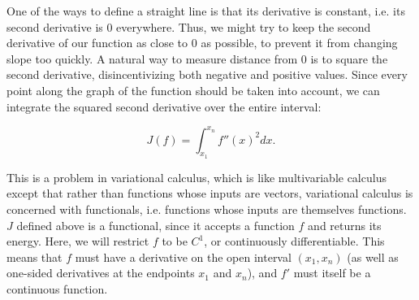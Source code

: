 \documentclass{article}
\begin{document}
One of the ways to define a straight line is that its derivative is constant,
i.e. its second derivative is 0 everywhere.
Thus, we might try to keep the second derivative of our function as close to 0 as possible,
to prevent it from changing slope too quickly.
A natural way to measure distance from 0 is to square the second derivative,
disincentivizing both negative and positive values.
Since every point along the graph of the function should be taken into account,
we can integrate the squared second derivative over the entire interval:

\[J(f) = \int_{x_1}^{x_n}f''(x)^2 dx.\]

This is a problem in variational calculus,
which is like multivariable calculus
except that rather than functions whose inputs are vectors,
variational calculus is concerned with functionals,
i.e. functions whose inputs are themselves functions.
$J$ defined above is a functional,
since it accepts a function $f$ and returns its energy.
Here, we will restrict $f$ to be $C^1$, or continuously differentiable.
This means that $f$ must have a derivative on the open interval $(x_1, x_n)$
(as well as one-sided derivatives at the endpoints $x_1$ and $x_n$),
and $f'$ must itself be a continuous function.
\end{document}
